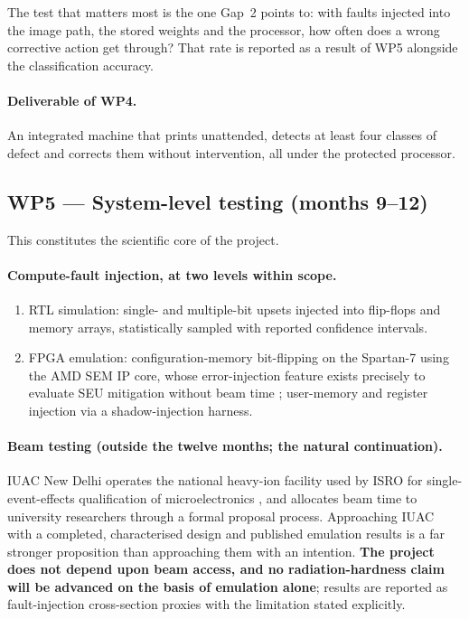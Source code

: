 \documentclass[11pt,a4paper]{article}
\begin{document}
The test that matters most is the one Gap~2 points to: with faults injected into
the image path, the stored weights and the processor, how often does a wrong
corrective action get through? That rate is reported as a result of WP5 alongside
the classification accuracy.

\paragraph{Deliverable of WP4.}
An integrated machine that prints unattended, detects at least four classes of
defect and corrects them without intervention, all under the protected processor.

\subsection{WP5 --- System-level testing (months 9--12)}

This constitutes the scientific core of the project.

\paragraph{Compute-fault injection, at two levels within scope.}
\begin{enumerate}
  \item RTL simulation: single- and multiple-bit upsets injected into flip-flops
        and memory arrays, statistically sampled with reported confidence
        intervals.
  \item FPGA emulation: configuration-memory bit-flipping on the Spartan-7 using
        the AMD SEM IP core, whose error-injection feature exists precisely to
        evaluate SEU mitigation without beam time \cite{semip}; user-memory and
        register injection via a shadow-injection harness.
\end{enumerate}

\paragraph{Beam testing (outside the twelve months; the natural continuation).}
IUAC New Delhi operates the national heavy-ion facility used by ISRO for
single-event-effects qualification of microelectronics \cite{iuac_annual2024},
and allocates beam time to university researchers through a formal proposal
process. Approaching IUAC with a completed, characterised design and published
emulation results is a far stronger proposition than approaching them with an
intention. \textbf{The project does not depend upon beam access, and no
radiation-hardness claim will be advanced on the basis of emulation alone};
results are reported as fault-injection cross-section proxies with the limitation
stated explicitly.
\end{document}
